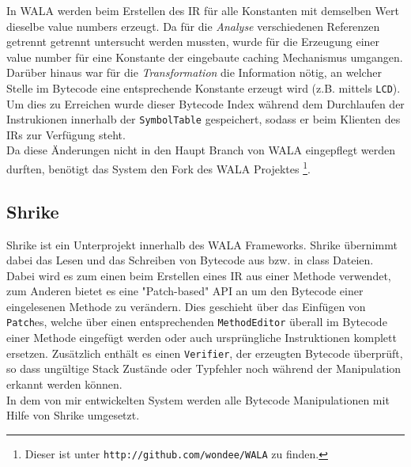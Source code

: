 In WALA werden beim Erstellen des IR für alle Konstanten mit demselben Wert dieselbe value numbers erzeugt. 
Da für die \textit{Analyse} verschiedenen Referenzen getrennt getrennt untersucht werden mussten, wurde 
für die Erzeugung einer value number für eine Konstante der eingebaute caching Mechanismus umgangen. 
\\
Darüber hinaus war für die \textit{Transformation} die Information nötig, an welcher Stelle im Bytecode eine
entsprechende Konstante erzeugt wird (z.B. mittels \texttt{LCD}). Um dies zu Erreichen wurde dieser Bytecode 
Index während dem Durchlaufen der Instrukionen innerhalb der \texttt{SymbolTable} gespeichert, sodass er 
beim Klienten des IRs zur Verfügung steht.
\\
Da diese Änderungen nicht in den Haupt Branch von WALA eingepflegt werden durften, benötigt das System den 
Fork des WALA Projektes \footnote{Dieser ist unter \texttt{http://github.com/wondee/WALA} zu finden.}.


\subsection{Shrike}

Shrike ist ein Unterprojekt innerhalb des WALA Frameworks. Shrike übernimmt dabei das Lesen und das 
Schreiben von Bytecode aus bzw. in class Dateien. Dabei wird es zum einen beim Erstellen eines IR aus einer 
Methode verwendet, zum Anderen bietet es eine "Patch-based" API an um den Bytecode einer eingelesenen 
Methode zu verändern. Dies geschieht über das Einfügen von \texttt{Patch}es, welche über einen 
entsprechenden \texttt{MethodEditor} überall im Bytecode einer Methode eingefügt werden oder auch 
ursprüngliche Instruktionen komplett ersetzen. Zusätzlich enthält es einen \texttt{Verifier}, der erzeugten 
Bytecode überprüft, so dass ungültige Stack Zustände oder Typfehler noch während der Manipulation erkannt 
werden können. 
\\
In dem von mir entwickelten System werden alle Bytecode Manipulationen mit Hilfe von Shrike umgesetzt. 

